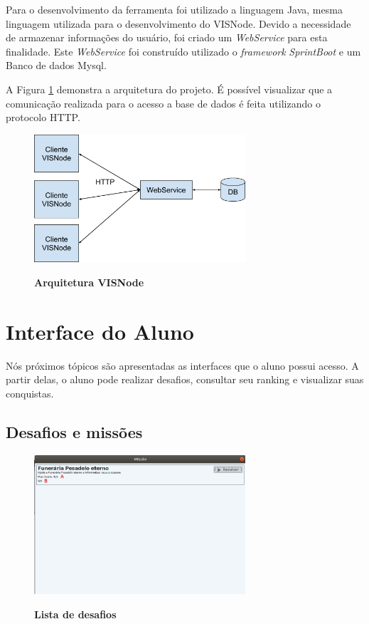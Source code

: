\documentclass[
	12pt,				%
	oneside,			%
	a4paper,			%
	english,			%
	french,				%
	spanish,			%
	brazil,				%
	]{abntex2}
\begin{document}
Para o desenvolvimento da ferramenta foi utilizado a linguagem Java, mesma linguagem utilizada para o desenvolvimento do VISNode. Devido a necessidade de armazenar informações do usuário, foi criado um \textit{WebService} para esta finalidade. Este \textit{WebService} foi construído utilizado o \textit{framework} \textit{SprintBoot} e um Banco de dados Mysql.

A Figura \ref{fig:visnodeArquitetura} demonstra a arquitetura do projeto. É possível visualizar que a comunicação realizada para o acesso a base de dados é feita utilizando o protocolo HTTP. 

\begin{figure}[ht]
\centering
\caption{\textbf{Arquitetura VISNode}}
\includegraphics[width=0.7\textwidth]{imagens/visnode_arquitetura.png}
\sourceAuthor
\label{fig:visnodeArquitetura}
\end{figure}

\section{Interface do Aluno}

Nós próximos tópicos são apresentadas as interfaces que o aluno possui acesso. A partir delas, o aluno pode realizar desafios, consultar seu ranking e visualizar suas conquistas.

\subsection{Desafios e missões}

\begin{figure}[H]
\centering
\caption{\textbf{Lista de desafios}}
\includegraphics[width=0.7\textwidth]{imagens/visnode_desafios.png}
\sourceAuthor
\label{fig:visnodeDesafios}
\end{figure}
\end{document}
